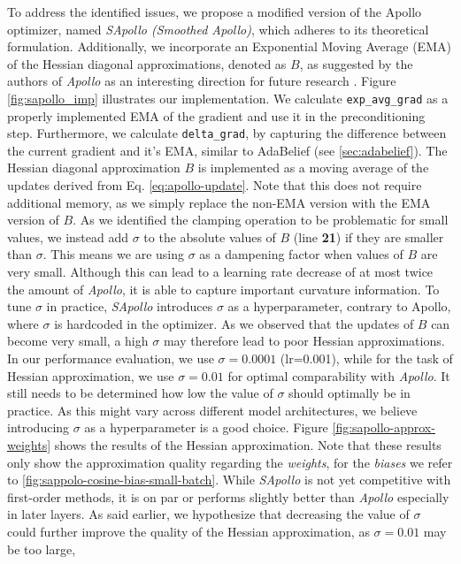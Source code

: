     To address the identified issues, we propose a modified version of the Apollo optimizer, named \emph{SApollo (Smoothed Apollo)}, which adheres to its theoretical formulation. Additionally, we incorporate an Exponential Moving Average (EMA) of the Hessian diagonal approximations, denoted as $B$, as suggested by the authors of \emph{Apollo} as an interesting direction for future research \cite{apollo}.
    Figure \ref{fig:sapollo_imp} illustrates our implementation. We calculate \texttt{exp\_avg\_grad} as a properly implemented EMA of the gradient and use it in the preconditioning step.
    Furthermore, we calculate \texttt{delta\_grad}, by capturing the difference between the current gradient and it's EMA, similar to AdaBelief (see \ref{sec:adabelief}).
    The Hessian diagonal approximation $B$ is implemented as a moving average of the updates derived from Eq. \ref{eq:apollo-update}.
    Note that this does not require additional memory, as we simply replace the non-EMA version with the EMA version of $B$.
    As we identified the clamping operation to be problematic for small values, we instead add $\sigma$ to the absolute values of $B$ (line \textbf{21}) if they are smaller than $\sigma$.
    This means we are using $\sigma$ as a dampening factor when values of $B$ are very small.
    Although this can lead to a learning rate decrease of at most twice the amount of \emph{Apollo}, it is able to capture
    important curvature information. To tune $\sigma$ in practice, \emph{SApollo} introduces $\sigma$ as a hyperparameter, contrary to Apollo,
    where $\sigma$ is hardcoded in the optimizer.
    As we observed that the updates of $B$ can become very small, a high $\sigma$ may therefore lead to poor Hessian approximations.
    In our performance evaluation, we use $\sigma = 0.0001$ (lr=0.001), while for the task of Hessian approximation, we use $\sigma = 0.01$ for optimal comparability with \emph{Apollo}.
    It still needs to be determined how low the value of $\sigma$ should optimally be in practice.
    As this might vary across different model architectures, we believe introducing $\sigma$ as a hyperparameter is a good choice.
    Figure \ref{fig:sapollo-approx-weights} shows the results of the Hessian approximation. Note that these results only show the
    approximation quality regarding the \emph{weights}, for the \emph{biases} we refer to \ref{fig:sappolo-cosine-bias-small-batch}.
    While \emph{SApollo} is not yet competitive with first-order methods, it is on par or performs slightly better than \emph{Apollo} especially in later layers.
    As said earlier, we hypothesize that decreasing the value of $\sigma$ could further improve the quality of the Hessian approximation, as $\sigma=0.01$ may be too large,
